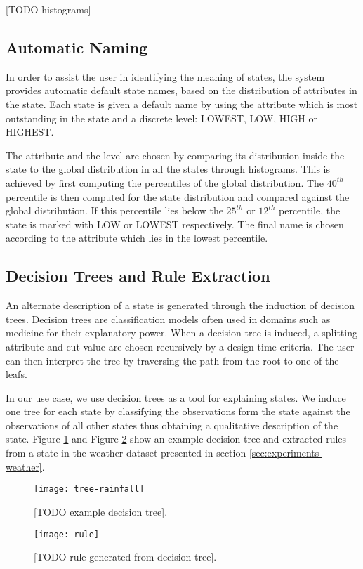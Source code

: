 [TODO histograms]

\subsection{Automatic Naming}

In order to assist the user in identifying the meaning of states, the system provides automatic default
state names, based on the distribution of attributes in the state. Each state is given a default name
by using the attribute which is most outstanding in the state and a discrete level: LOWEST, LOW, HIGH or
HIGHEST.

The attribute and the level are chosen by comparing its distribution inside the state to the global
distribution in all the states through histograms. This is achieved by first computing the percentiles
of the global distribution. The $40^{th}$ percentile is then computed for the state distribution and
compared against the global distribution. If this percentile lies below the $25^{th}$ or $12^{th}$
percentile, the state is marked with LOW or LOWEST respectively. The final name is chosen according
to the attribute which lies in the lowest percentile.


\subsection{Decision Trees and Rule Extraction}

An alternate description of a state is generated through the induction of decision trees. Decision
trees are classification models often used in domains such as medicine for their explanatory power.
When a decision tree is induced, a splitting attribute and cut value are chosen recursively by a
design time criteria. The user can then interpret the tree by traversing the path from the root 
to one of the leafs.

In our use case, we use decision trees as a tool for explaining states. We induce one tree for each
state by classifying the observations form the state against the observations of all other states
thus obtaining a qualitative description of the state. Figure \ref{fig:example-decision-tree} and
Figure \ref{fig:example-decision-tree-rule} show an example decision tree and extracted rules
from a state in the weather dataset presented in section \ref{sec:experiments-weather}.

\begin{figure}[h!]
	\centering
	\texttt{[image: tree-rainfall]}
	\caption{[TODO example decision tree].}
	\label{fig:example-decision-tree}
\end{figure}

\begin{figure}[h!]
	\centering
	\texttt{[image: rule]}
	\caption{[TODO rule generated from decision tree].}
	\label{fig:example-decision-tree-rule}
\end{figure}